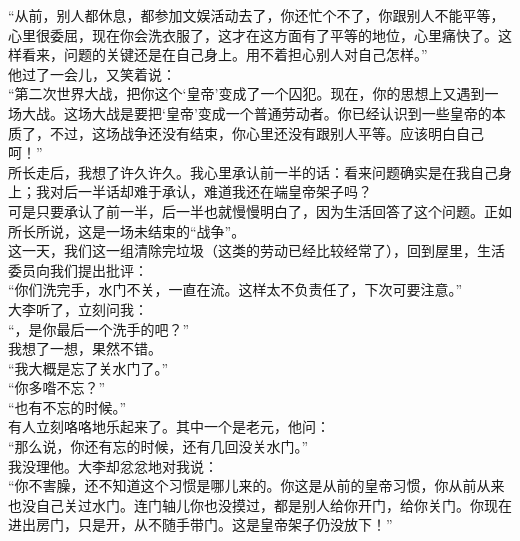 “从前，别人都休息，都参加文娱活动去了，你还忙个不了，你跟别人不能平等，心里很委屈，现在你会洗衣服了，这才在这方面有了平等的地位，心里痛快了。这样看来，问题的关键还是在自己身上。用不着担心别人对自己怎样。”\\

他过了一会儿，又笑着说：\\

“第二次世界大战，把你这个‘皇帝’变成了一个囚犯。现在，你的思想上又遇到一场大战。这场大战是要把‘皇帝’变成一个普通劳动者。你已经认识到一些皇帝的本质了，不过，这场战争还没有结束，你心里还没有跟别人平等。应该明白自己呵！”\\

所长走后，我想了许久许久。我心里承认前一半的话：看来问题确实是在我自己身上；我对后一半话却难于承认，难道我还在端皇帝架子吗？\\

可是只要承认了前一半，后一半也就慢慢明白了，因为生活回答了这个问题。正如所长所说，这是一场未结束的“战争”。\\

这一天，我们这一组清除完垃圾（这类的劳动已经比较经常了），回到屋里，生活委员向我们提出批评：\\

“你们洗完手，水门不关，一直在流。这样太不负责任了，下次可要注意。”\\

大李听了，立刻问我：\\

“，是你最后一个洗手的吧？”\\

我想了一想，果然不错。\\

“我大概是忘了关水门了。”\\

“你多喒不忘？”\\

“也有不忘的时候。”\\

有人立刻咯咯地乐起来了。其中一个是老元，他问：\\

“那么说，你还有忘的时候，还有几回没关水门。”\\

我没理他。大李却忿忿地对我说：\\

“你不害臊，还不知道这个习惯是哪儿来的。你这是从前的皇帝习惯，你从前从来也没自己关过水门。连门轴儿你也没摸过，都是别人给你开门，给你关门。你现在进出房门，只是开，从不随手带门。这是皇帝架子仍没放下！”\\

